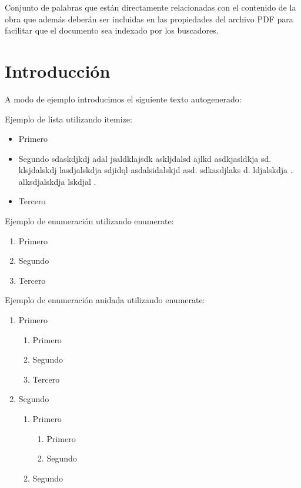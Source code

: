 \documentclass[12pt,a4paper,oneside]{book}
\begin{document}
\vspace{1cm}

Conjunto de palabras que están directamente relacionadas con el contenido de la obra que además deberán ser incluidas en las
propiedades del archivo PDF para facilitar que el documento sea indexado por los buscadores.





\tableofcontents

\chapter{Introducción} 
\label{intro} %

A modo de ejemplo introducimos el siguiente texto autogenerado:



Ejemplo de lista utilizando itemize:
\begin{itemize}
    \item Primero
    \item Segundo sdaskdjkdj adal jsaldklajsdk askljdalsd ajlkd asdkjasldkja sd. klsjdalskdj lasdjalskdja sdjidql asdalsidalskjd asd. sdkasdjlaks d. ldjalskdja . alksdjalskdja lskdjal .
    \item Tercero\\
\end{itemize}

Ejemplo de enumeración utilizando enumerate:
\begin{enumerate}
    \item Primero
    \item Segundo
    \item Tercero\\
\end{enumerate}

Ejemplo de enumeración anidada utilizando enumerate:
\begin{enumerate}
    \item Primero 
        \begin{enumerate}
        \item Primero
        \item Segundo
        \item Tercero
        \end{enumerate}
    \item Segundo
        \begin{enumerate}
        \item Primero
            \begin{enumerate}
            \item Primero
            \item Segundo
            \end{enumerate}
        \item Segundo
        \end{enumerate}
\end{enumerate}
\end{document}
